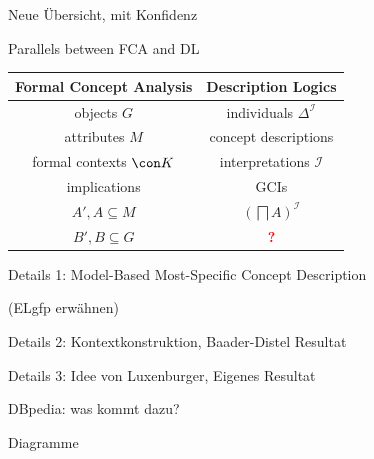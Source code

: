 \documentclass[ngerman]{beamer}
\begin{document}
\begin{frame}
  Neue Übersicht, mit Konfidenz
\end{frame}

\begin{frame}

  \onslide<+->

  \begin{block}{Parallels between FCA and DL}
    \begin{center}
      \begin{tabular}{c|c}
        Formal Concept Analysis & Description Logics\\
        \midrule\onslide<+->
        objects $G$ & individuals $\Delta^{\mathcal{I}}$ \\\onslide<+->
        attributes $M$ & concept descriptions \\\onslide<+->
        formal contexts $\con K$ & interpretations $\mathcal{I}$ \\\onslide<+->
        implications & GCIs \\\onslide<+->
        $A', A \subseteq M$ & $(\bigsqcap A)^{\mathcal{I}}$ \\\onslide<+->
        $B', B \subseteq G$ & \textcolor{red}{\textbf{?}}
      \end{tabular}
    \end{center}
  \end{block}

  Details 1: Model-Based Most-Specific Concept Description

  (ELgfp erwähnen)
\end{frame}

\begin{frame}
  Details 2: Kontextkonstruktion, Baader-Distel Resultat
\end{frame}

\begin{frame}
  Details 3: Idee von Luxenburger, Eigenes Resultat
\end{frame}

\begin{frame}
  DBpedia: was kommt dazu?
\end{frame}

\begin{frame}
  Diagramme
\end{frame}
\end{document}
